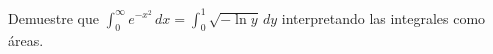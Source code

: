 \item Demuestre que $\int_{0}^{\infty} e^{-x^2} \, dx = \int_{0}^{1} \sqrt{-\ln y} \, dy$ interpretando las integrales como áreas.
